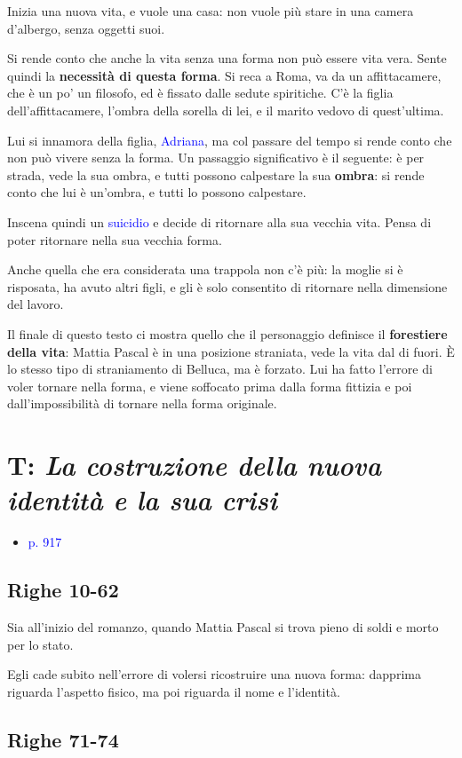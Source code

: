 \documentclass[a4paper, twoside, titlepage]{book}
\newcommand{\elenco}[1]{%
\begin{itemize}
#1
\end{itemize}}
\renewcommand{\emph}[1]{\textcolor{blue}{#1}}
\begin{document}
Inizia una nuova vita, e vuole una casa: non vuole più stare in una camera d'albergo, senza oggetti suoi.

Si rende conto che anche la vita senza una forma non può essere vita vera. Sente quindi la \textbf{necessità di questa forma}.
Si reca a Roma, va da un affittacamere, che è un po' un filosofo, ed è fissato dalle sedute spiritiche.
C'è la figlia dell'affittacamere, l'ombra della sorella di lei, e il marito vedovo di quest'ultima.

Lui si innamora della figlia, \emph{Adriana}, ma col passare del tempo si rende conto che non può vivere senza la forma. Un passaggio significativo è il seguente: è per strada, vede la sua ombra, e tutti possono calpestare la sua \textbf{ombra}: si rende conto che lui è un'ombra, e tutti lo possono calpestare.

Inscena quindi un \emph{suicidio} e decide di ritornare alla sua vecchia vita. Pensa di poter ritornare nella sua vecchia forma.

Anche quella che era considerata una trappola non c'è più: la moglie si è risposata, ha avuto altri figli, e gli è solo consentito di ritornare nella dimensione del lavoro.


Il finale di questo testo ci mostra quello che il personaggio definisce il \textbf{forestiere della vita}: Mattia Pascal è in una posizione straniata, vede la vita dal di fuori. È lo stesso tipo di straniamento di Belluca, ma è forzato.
Lui ha fatto l'errore di voler tornare nella forma, e viene soffocato prima dalla forma fittizia e poi dall'impossibilità di tornare nella forma originale.

\section{T: \textit{La costruzione della nuova identità e la sua crisi}}
\elenco{\item \emph{p. 917}}

\subsection*{Righe 10-62}

Sia all'inizio del romanzo, quando Mattia Pascal si trova pieno di soldi e morto per lo stato.

Egli cade subito nell'errore di volersi ricostruire una nuova forma: dapprima riguarda l'aspetto fisico, ma poi riguarda il nome e l'identità.

\subsection*{Righe 71-74}
\end{document}
